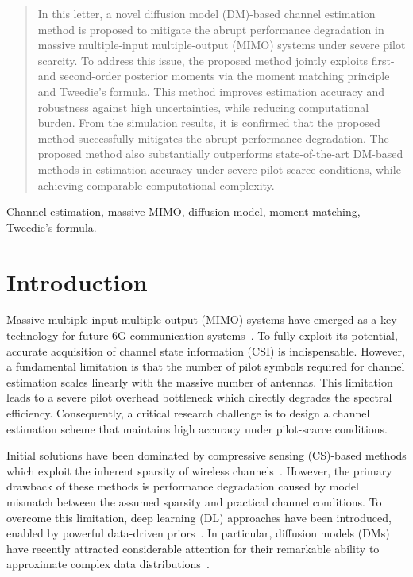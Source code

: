 \documentclass[lettersize,journal]{IEEEtran}
\begin{document}
\maketitle
\begin{abstract}
In this letter, a novel diffusion model (DM)-based channel estimation method is proposed to mitigate the abrupt performance degradation in massive multiple-input multiple-output (MIMO) systems under severe pilot scarcity. To address this issue, the proposed method jointly exploits first- and second-order posterior moments via the moment matching principle and Tweedie’s formula. This method improves estimation accuracy and robustness against high uncertainties, while reducing computational burden. From the simulation results, it is confirmed that the proposed method successfully mitigates the abrupt performance degradation. The proposed method also substantially outperforms state-of-the-art DM-based methods in estimation accuracy under severe pilot-scarce conditions, while achieving comparable computational complexity.
\end{abstract}

\begin{IEEEkeywords}
Channel estimation, massive MIMO, diffusion model, moment matching, Tweedie's formula.
\end{IEEEkeywords}


\section{Introduction}

Massive multiple-input-multiple-output (MIMO) systems have emerged as a key technology for future 6G communication systems~\cite{busariMillimeterWaveMassiveMIMO2018}. To fully exploit its potential, accurate acquisition of channel state information (CSI) is indispensable. However, a fundamental limitation is that the number of pilot symbols required for channel estimation scales linearly with the massive number of antennas. This limitation leads to a severe pilot overhead bottleneck which directly degrades the spectral efficiency. Consequently, a critical research challenge is to design a channel estimation scheme that maintains high accuracy under pilot-scarce conditions.

Initial solutions have been dominated by compressive sensing (CS)-based methods which exploit the inherent sparsity of wireless channels~\cite{zhangAtomicNormDenoisingBased2018,choiCompressedSensingWireless2017}. However, the primary drawback of these methods is performance degradation caused by model mismatch between the assumed sparsity and practical channel conditions. To overcome this limitation, deep learning (DL) approaches have been introduced, enabled by powerful data-driven priors~\cite{kimDeepLearningaidedWireless2023}. In particular, diffusion models (DMs) have recently attracted considerable attention for their remarkable ability to approximate complex data distributions~\cite{hoDenoisingDiffusionProbabilistic2020,vanhuynhGenerativeAIPhysical2024}.
\end{document}
